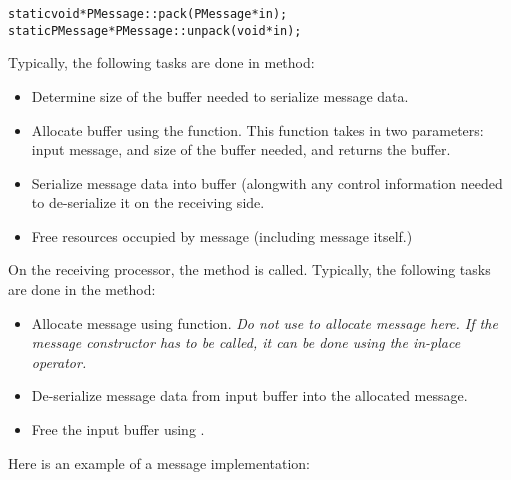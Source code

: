 \begin{alltt}
static void *PMessage::pack(PMessage *in);
static PMessage *PMessage::unpack(void *in);
\end{alltt}

Typically, the following tasks are done in  method:

\begin{itemize}

\item Determine size of the buffer needed to serialize message data.

\item Allocate buffer using the  function. This function
takes in two parameters: input message, and size of the buffer needed, and
returns the buffer.

\item Serialize message data into buffer (alongwith any control information
needed to de-serialize it on the receiving side.

\item Free resources occupied by message (including message itself.)  

\end{itemize}

On the receiving processor, the  method is called. Typically, the
following tasks are done in the  method:

\begin{itemize}

\item Allocate message using  function. {\em Do not
use  to allocate message here. If the message constructor has
to be called, it can be done using the in-place  operator.}

\item De-serialize message data from input buffer into the allocated message.

\item Free the input buffer using .

\end{itemize}

Here is an example of a  message implementation:

